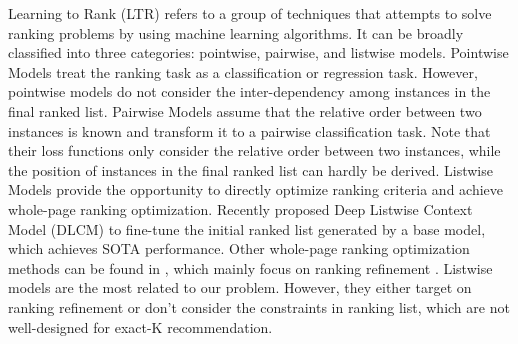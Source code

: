 Learning to Rank (LTR) refers to a group of techniques that attempts to solve ranking problems by using machine learning algorithms.
It can be broadly classified into three categories: pointwise, pairwise, and listwise models.
Pointwise Models \cite{koren2009matrix,he2017neural,wang2017irgan} treat the ranking task as a classification or regression task.
However, pointwise models do not consider the inter-dependency among instances in the final ranked list.
Pairwise Models \cite{rendle2009bpr,wang2017irgan,he2018adversarial} assume that the relative order between two instances is known and transform it to a pairwise classification task.
Note that their loss functions only consider the relative order between two instances,
while the position of instances in the final ranked list can hardly be derived.
Listwise Models provide the opportunity to directly optimize ranking criteria and achieve whole-page ranking optimization.
Recently \cite{ai2018learning} proposed Deep Listwise Context Model (DLCM) to fine-tune the initial ranked list generated by a base model,
which achieves SOTA performance.
Other whole-page ranking optimization methods can be found in \cite{bello2018seq2slate,jiang2018beyond},
which mainly focus on ranking refinement \cite{jin2008ranking}.
Listwise models are the most related to our problem.
However, they either target on ranking refinement or don't consider the constraints in ranking list,
which are not well-designed for exact-K recommendation.


